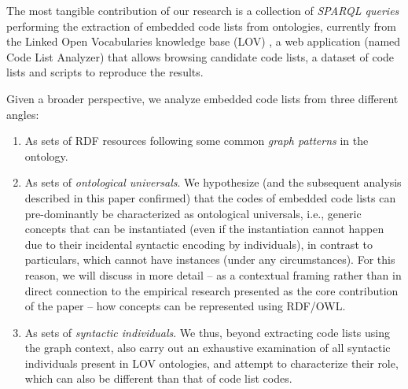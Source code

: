 

The most tangible contribution of our research is a collection of \emph{SPARQL queries} performing the extraction of embedded code lists from ontologies, currently from the Linked Open Vocabularies knowledge base  (LOV) \cite{DBLP:journals/semweb/VandenbusscheAP17}, a web application (named Code List Analyzer) that allows browsing candidate code lists, a dataset of code lists and scripts to reproduce the results.


Given a broader perspective, we analyze embedded code lists from three different angles:
\begin{enumerate}
    \item As sets of RDF resources following some common \emph{graph patterns} in the ontology.%
    \item As sets of \emph{ontological universals}. We hypothesize (and the subsequent analysis described in this paper confirmed) that the codes of embedded code lists can pre-dominantly be characterized as ontological universals, i.e., generic concepts that can be instantiated (even if the instantiation cannot happen due to their incidental syntactic encoding by individuals), in contrast to particulars, which cannot have instances (under any circumstances). For this reason, we will discuss in more detail -- as a contextual framing rather than in direct connection to the empirical research presented as the core contribution of the paper -- how concepts can be represented using RDF/OWL.
    \item As sets of \emph{syntactic individuals}. We thus, beyond extracting code lists using the graph context, also carry out an exhaustive examination of all syntactic individuals present in LOV ontologies, and attempt to characterize their role, which can also be different than that of code list codes.
\end{enumerate}

